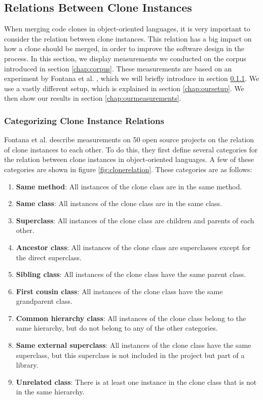 \documentclass[a4paper]{article}
\begin{document}
\subsection{Relations Between Clone Instances} \label{chap:relationsinstances}
When merging code clones in object-oriented languages, it is very important to consider the relation between clone instances. This relation has a big impact on how a clone should be merged, in order to improve the software design in the process. In this section, we display measurements we conducted on the corpus introduced in section \ref{chap:corpus}. These measurements are based on an experiment by Fontana et al. \cite{fontana2015duplicated}, which we will briefly introduce in section \ref{chap:catcloneinstancerelations}. We use a vastly different setup, which is explained in section \ref{chap:oursetup}. We then show our results in section \ref{chap:ourmeasurements}.

\subsubsection{Categorizing Clone Instance Relations}\label{chap:catcloneinstancerelations}
Fontana et al. \cite{fontana2015duplicated} describe measurements on 50 open source projects on the relation of clone instances to each other. To do this, they first define several categories for the relation between clone instances in object-oriented languages. A few of these categories are shown in figure \ref{fig:clonerelation}. These categories are as follows:
\begin{enumerate}
  \item \textbf{Same method}: All instances of the clone class are in the same method.
  \item \textbf{Same class}: All instances of the clone class are in the same class.
  \item \textbf{Superclass}: All instances of the clone class are children and parents of each other.
  \item \textbf{Ancestor class}: All instances of the clone class are superclasses except for the direct superclass.
  \item \textbf{Sibling class}: All instances of the clone class have the same parent class.
  \item \textbf{First cousin class}: All instances of the clone class have the same grandparent class.
\item \textbf{Common hierarchy class}: All instances of the clone class belong to the same hierarchy, but do not belong to any of the other categories.
\item \textbf{Same external superclass}: All instances of the clone class have the same superclass, but this superclass is not included in the project but part of a library.
\item \textbf{Unrelated class}: There is at least one instance in the clone class that is not in the same hierarchy.
\end{enumerate}
\end{document}
